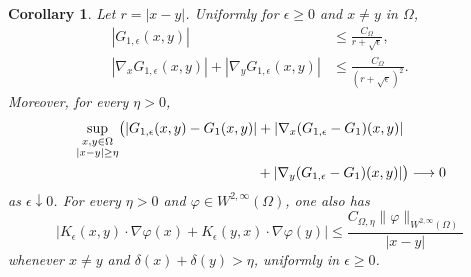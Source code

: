 \documentclass[11pt,reqno]{amsproc}
\newtheorem{corollary}{Corollary}[section]
\newcommand{\Om}{\Omega}
\begin{document}
\begin{corollary}
\label{cor:regularized-dirichlet-kernel-bounds}
Let $r=|x-y|$.  Uniformly for $\epsilon\geq0$ and $x\neq y$ in $\Om$,
\begin{align}
 |G_{1,\epsilon}(x,y)|
 &\leq \frac{C_\Om}{r+\sqrt\epsilon},
 \label{eq:regularized-domain-G-bound}\\
 |\nabla_xG_{1,\epsilon}(x,y)|
 +|\nabla_yG_{1,\epsilon}(x,y)|
 &\leq \frac{C_\Om}{(r+\sqrt\epsilon)^2}.
 \label{eq:regularized-domain-gradient-bound}
\end{align}
Moreover, for every $\eta>0$,
\begin{equation}\label{eq:domain-off-diagonal-convergence}
\begin{aligned}
 &\sup_{\substack{x,y\in\Om\\ |x-y|\geq\eta}}
 \bigl(
 |G_{1,\epsilon}(x,y)-G_1(x,y)|
 +|\nabla_x(G_{1,\epsilon}-G_1)(x,y)|\\
 &\hspace{46mm}
 +|\nabla_y(G_{1,\epsilon}-G_1)(x,y)|
 \bigr)
 \longrightarrow0
\end{aligned}
\end{equation}
as $\epsilon\downarrow0$.
For every $\eta>0$ and $\varphi\in W^{2,\infty}(\Om)$, one also has
\begin{equation}\label{eq:domain-kernel-bound-interior}
 \left|K_\epsilon(x,y)\cdot\nabla\varphi(x)
 +K_\epsilon(y,x)\cdot\nabla\varphi(y)\right|
 \leq
 \frac{C_{\Om,\eta}\|\varphi\|_{W^{2,\infty}(\Om)}}{|x-y|}
\end{equation}
whenever $x\ne y$ and $\delta(x)+\delta(y)>\eta$, uniformly in
$\epsilon\geq0$.
\end{corollary}
\end{document}
